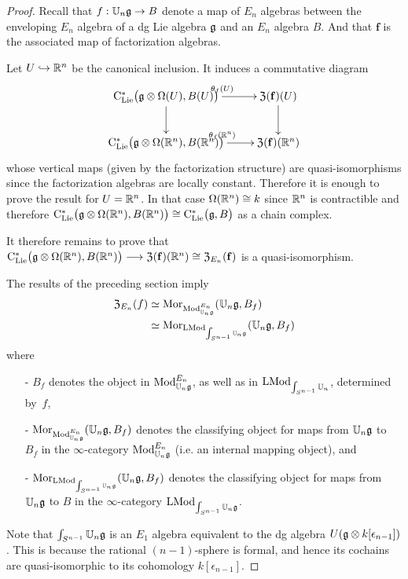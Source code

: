 \documentclass[11pt]{amsart}
\numberwithin{equation}{section}
\begin{document}
\begin{proof}
Recall that $f: \mathbb U_n \mathfrak g \to B$ denote a map of $E_n$ algebras between the enveloping $E_n$ algebra of a dg Lie algebra $\mathfrak g$ and an $E_n$ algebra $B$.
And that $\mathbf{f}$ is the associated map of factorization algebras. 

Let $U\hookrightarrow \mathbb R^n$ be the canonical inclusion. It induces a commutative diagram 
 \[ \xymatrix{ \clies\big(\fg\otimes \Omega (U), B(U) \big) \ar[d] \ar[r]^{\theta_f(U)} &
\ar[d] {\frak Z}(\mathbf{f})(U)\\
 \clies\big(\fg\otimes \Omega (\RR^n), B(\RR^n) \big)
 \ar[r]^{\theta_f(\RR^n)}& {\frak Z}(\mathbf{f})(\RR^n)}  \]
whose vertical maps (given by the factorization structure) are quasi-isomorphisms since the factorization algebras 
are locally constant. 
Therefore it is enough to prove the result for $U=\mathbb R^n$. 
In that case $\Omega(\mathbb R^n) \cong k$ since $\mathbb R^n$ is contractible and therefore  ${\rm C}_{\rm Lie}^*\big(\mathfrak g\otimes \Omega (\mathbb R^n), B(\mathbb R^n) \big) \cong {\rm C}_{\rm Lie}^* \big(\mathfrak g, B\big)$ as a chain complex.

It therefore remains to prove that 
${\rm C}_{\rm Lie}^*\big(\mathfrak g\otimes \Omega (\mathbb R^n), B(\mathbb R^n) \big) \longrightarrow 
 {\frak Z}(\mathbf{f})(\mathbb R^n)\cong {\frak Z}_{E_n}(\mathbf{f})$ is a quasi-isomorphism. 
 
  

The results of the preceding section imply
\begin{align*}
{\frak Z}_{E_n}(f) &\simeq {{\rm Mor}}_{{\rm Mod}^{E_n}_{\mathbb U_n\mathfrak g}}(\mathbb U_n \mathfrak g, B_f) \\
&\simeq {\rm Mor}_{{\rm LMod}_{\int_{S^{n-1}} \mathbb U_n\mathfrak g}}(\mathbb U_n \mathfrak g, B_f)
\end{align*}
where 
\begin{itemize}
\item[-] $B_f$ denotes the object in ${\rm Mod}^{E_n}_{\mathbb U_n\mathfrak g}$, as well as in ${\rm LMod}_{\int_{S^{n-1}}\mathbb U_n}$, determined by~$f$, 
\item[-] ${\rm Mor}_{{\rm Mod}^{E_n}_{\mathbb U_n\mathfrak g}}(\mathbb U_n \mathfrak g, B_f)$ denotes the classifying object for maps from $\mathbb U_n\mathfrak g$ to $B_f$ in the $\infty$-category ${\rm Mod}^{E_n}_{\mathbb U_n\mathfrak g}$ (i.e. an internal mapping object), and
\item[-] ${\rm Mor}_{{\rm LMod}_{\int_{S^{n-1}} \mathbb U_n\mathfrak g}} (\mathbb U_n \mathfrak g, B_f)$ denotes the classifying object for maps from ${\mathbb U_n\mathfrak g}$ to $B$ in the $\infty$-category ${\rm LMod}_{\int_{S^{n-1}}\mathbb U_n\mathfrak g}$. 
\end{itemize}
Note that $\int_{S^{n-1}}\mathbb U_n\mathfrak g$ is an $E_1$ algebra equivalent to the dg algebra $U(\mathfrak g \otimes k[\epsilon_{n-1}])$.
This is because the rational $(n-1)$-sphere is formal, and hence its cochains are quasi-isomorphic to its cohomology $k[\epsilon_{n-1}]$. 
 




\end{proof}
\end{document}
